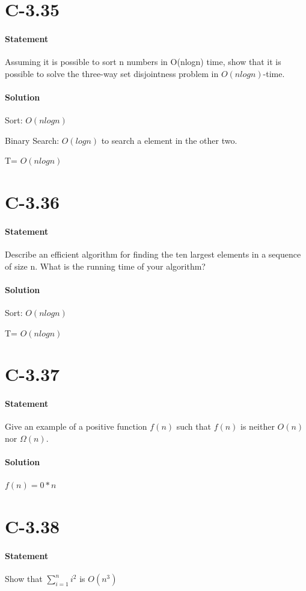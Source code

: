 \documentclass{article}
\begin{document}
\section{C-3.35}
  \paragraph{Statement}
  Assuming it is possible to sort n numbers in O(nlogn) time, show that it is possible to solve the three-way set disjointness problem in $O(nlogn)$-time.
  \paragraph{Solution}
  Sort: $O(nlogn)$\par
  Binary Search: $O(logn)$ to search a element in the other two.\par
  T= $O(nlogn)$ 
\section{C-3.36}
  \paragraph{Statement}
  Describe an efficient algorithm for finding the ten largest elements in a sequence of size n. What is the running time of your algorithm?
  \paragraph{Solution}
  Sort: $O(nlogn)$\par
  T= $O(nlogn)$ 
\section{C-3.37}
  \paragraph{Statement}
  Give an example of a positive function $f (n)$ such that $f (n)$ is neither $O(n)$ nor $\Omega(n)$.
  \paragraph{Solution}
  $f(n) = 0*n$
\newpage
\section{C-3.38}
  \paragraph{Statement}
  Show that $\sum_{i=1}^{n}i^2$ is $O(n^3)$
\end{document}
